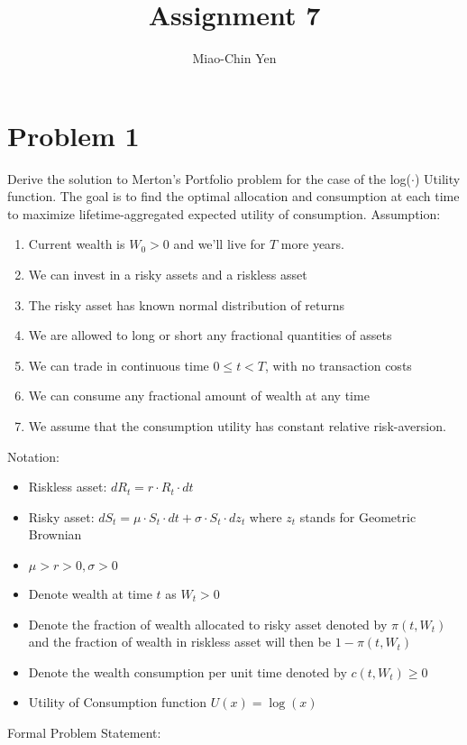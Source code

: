 \documentclass{article}
\title{Assignment 7}
\author{Miao-Chin Yen}
\begin{document}
\maketitle

\section*{Problem 1}
Derive the solution to Merton's Portfolio problem for the case of the log($\cdot$) Utility function. The goal is to find the optimal allocation and consumption at each time to maximize lifetime-aggregated expected utility of consumption.
Assumption:
\begin{enumerate}
\item Current wealth is $W_{0}>0$ and we'll live for $T$ more years.
\item We can invest in a risky assets and a riskless asset
\item The risky asset has known normal distribution of returns
\item We are allowed to long or short any fractional quantities of assets
\item We can trade in continuous time $0 \leq t<T$, with no transaction costs
\item We can consume any fractional amount of wealth at any time
\item We assume that the consumption utility has constant relative risk-aversion.

\end{enumerate}
Notation:
\begin{itemize}
\item Riskless asset: $d R_{t}=r \cdot R_{t} \cdot d t$
\item Risky asset: $d S_{t}=\mu \cdot S_{t} \cdot d t+\sigma \cdot S_{t} \cdot d z_{t}$ where $z_{t}$ stands for Geometric Brownian
\item $\mu>r>0, \sigma>0$
\item Denote wealth at time $t$ as $W_{t}>0$
\item Denote the fraction of wealth allocated to risky asset denoted by $\pi\left(t, W_{t}\right)$ and the fraction of wealth in riskless asset will then be $1-\pi\left(t, W_{t}\right)$
\item Denote the wealth consumption per unit time denoted by $c\left(t, W_{t}\right) \geq 0$
\item Utility of Consumption function $U(x)=\log (x)$ 
\end{itemize}
Formal Problem Statement:
\end{document}
